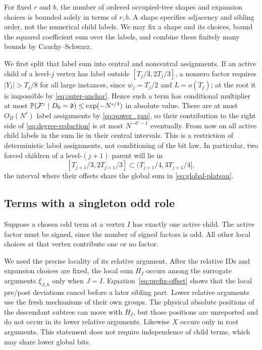 For fixed $r$ and $b$, the number of ordered occupied-tree shapes and expansion choices is bounded solely in terms of $r,b$.  A shape specifies adjacency and sibling order, not the numerical child labels.  We may fix a shape and its choices, bound the squared coefficient sum over the labels, and combine these finitely many bounds by Cauchy--Schwarz.

We first split that label sum into central and noncentral assignments.  If an active child of a level-$j$ vertex has label outside $[T_j/3,2T_j/3]$, a nonzero factor requires $|Y_I|>T_j/8$ for all large instances, since $w_j=T_j/2$ and $L=o(T_j)$; at the root it is impossible by \eqref{eq:outer-anchor}.  Hence such a term has conditional multiplier at most
$\mathbb P(\mathcal F^c\mid D_0=\mathfrak d)\le\exp(-N^{\epsilon/4})$ in absolute value.  There are at most $O_B(N^r)$ label assignments by \eqref{eq:power_gap}, so their contribution to the right side of \eqref{eq:degree-reduction} is at most $N^{-d'-1}$ eventually.  From now on all active child labels in the sum lie in their central intervals.  This is a restriction of deterministic label assignments, not conditioning of the bit law.  In particular, two forced children of a level-$(j+1)$ parent will lie in
\[
 [T_{j+1}/3,2T_{j+1}/3]\subset(T_{j+1}/4,3T_{j+1}/4],
\]
the interval where their offsets share the global sum in \eqref{eq:global-plateau}.

\subsection{Terms with a singleton odd role}

Suppose a chosen odd term at a vertex $I$ has exactly one active child.  The active factor must be signed, since the number of signed factors is odd.  All other local choices at that vertex contribute one or no factor.

We need the precise locality of its relative argument.  After the relative IDs and expansion choices are fixed, the local sum $H_I$ occurs among the surrogate arguments $\xi_{J,h}$ only when $J=I$.  Equation~\eqref{eq:prefix-offset} shows that the local pre/post deviations cancel before a later sibling part.  Lower relative arguments use the fresh mechanisms of their own groups.  The physical absolute positions of the descendant subtree can move with $H_I$, but those positions are unreported and do not occur in its lower relative arguments.  Likewise $X$ occurs only in root arguments.  This statement does not require independence of child terms, which may share lower global bits.

